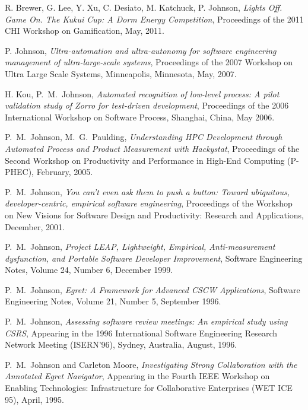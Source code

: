 \begin{Workshop Publications}

\item R. Brewer, G. Lee, Y. Xu, C. Desiato, M. Katchuck, P. Johnson, 
{\em Lights Off. Game On. The Kukui Cup: A Dorm Energy Competition},
Proceedings of the 2011 CHI Workshop on Gamification, May, 2011.

\item P. Johnson, {\em Ultra-automation and ultra-autonomy for software
engineering management of ultra-large-scale systems}, Proceedings of the
2007 Workshop on Ultra Large Scale Systems, Minneapolis, Minnesota, May,
2007.

\item H. Kou, P.~M.~Johnson, 
{\em Automated recognition of low-level process: A pilot validation study
of Zorro for test-driven development}, Proceedings of the 2006 
International Workshop on Software Process, Shanghai, China, May 2006.

\item P.~M.~Johnson, M.~G.~Paulding, 
  {\em Understanding HPC Development through Automated Process and Product Measurement with Hackystat},
  Proceedings of the Second Workshop on Productivity and Performance in High-End Computing (P-PHEC), 
 February, 2005.

\item P.~M.~Johnson, 
  {\em You can't even ask them to push a button: Toward ubiquitous,
  developer-centric,
empirical software engineering}, Proceedings of the Workshop
on New Visions for Software Design and Productivity: Research
and Applications, December, 2001.

\item P.~M.~Johnson, 
  {\em Project {LEAP}, Lightweight, Empirical, Anti-measurement
  dysfunction, and Portable Software Developer Improvement}, 
  Software Engineering Notes, Volume 24, Number 6, December 1999.


\item P.~M.~Johnson, 
  {\em Egret: A Framework for Advanced CSCW Applications}, 
  Software Engineering Notes, Volume 21, Number 5, September 1996.


\item P.~M.~Johnson,
  {\em Assessing software review meetings: An empirical study using CSRS}, 
  Appearing in the 1996 International Software Engineering Research Network
  Meeting (ISERN'96), Sydney, Australia, August, 1996.


\item P.~M.~Johnson and Carleton Moore,
  {\em Investigating Strong Collaboration with the Annotated Egret Navigator}, 
  Appearing in the Fourth IEEE Workshop on Enabling 
  Technologies: Infrastructure for Collaborative Enterprises (WET ICE 95),
  April, 1995.


\end{Workshop Publications}
